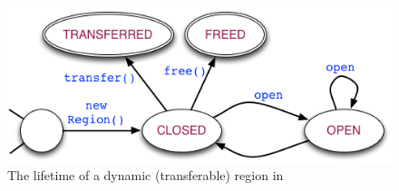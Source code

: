





\begin{figure} 
\includegraphics[scale=0.45]{region-fsm.png}
\caption{The lifetime of a dynamic (transferable) region in \name}
\label{fig:region-fsm} 
\vspace*{-0.1in} 
\end{figure}

